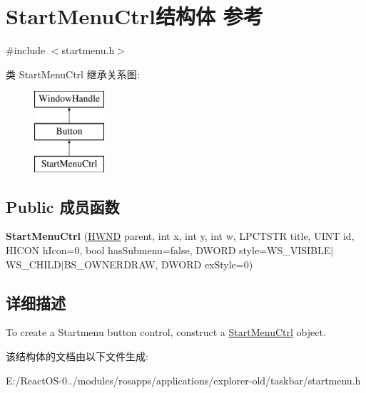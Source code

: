 \hypertarget{struct_start_menu_ctrl}{}\section{Start\+Menu\+Ctrl结构体 参考}
\label{struct_start_menu_ctrl}


{\ttfamily \#include $<$startmenu.\+h$>$}

类 Start\+Menu\+Ctrl 继承关系图\+:\begin{figure}[H]
\begin{center}
\leavevmode
\includegraphics[height=3.000000cm]{struct_start_menu_ctrl}
\end{center}
\end{figure}
\subsection*{Public 成员函数}
\begin{DoxyCompactItemize}
\item 
\mbox{\label{struct_start_menu_ctrl_abe3ad1671daa5f619d0f440d3e62f29d}} 
{\bfseries Start\+Menu\+Ctrl} (\hyperlink{interfacevoid}{H\+W\+ND} parent, int x, int y, int w, L\+P\+C\+T\+S\+TR title, U\+I\+NT id, H\+I\+C\+ON h\+Icon=0, bool has\+Submenu=false, D\+W\+O\+RD style=W\+S\+\_\+\+V\+I\+S\+I\+B\+LE$\vert$W\+S\+\_\+\+C\+H\+I\+LD$\vert$B\+S\+\_\+\+O\+W\+N\+E\+R\+D\+R\+AW, D\+W\+O\+RD ex\+Style=0)
\end{DoxyCompactItemize}


\subsection{详细描述}
To create a Startmenu button control, construct a \hyperlink{struct_start_menu_ctrl}{Start\+Menu\+Ctrl} object. 

该结构体的文档由以下文件生成\+:\begin{DoxyCompactItemize}
\item 
E\+:/\+React\+O\+S-\/0../modules/rosapps/applications/explorer-\/old/taskbar/startmenu.\+h\end{DoxyCompactItemize}
